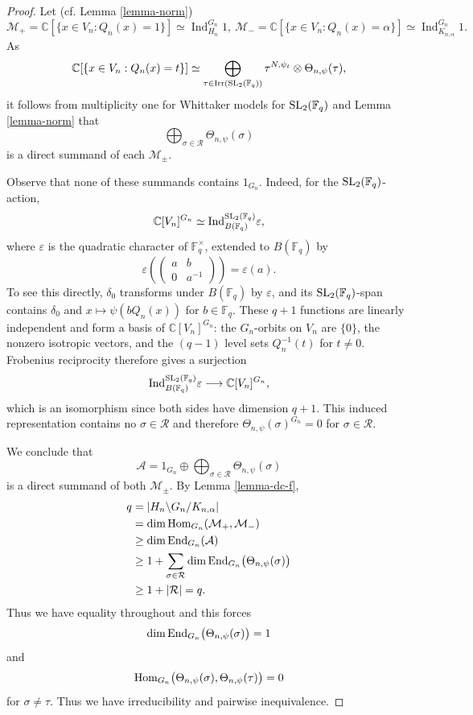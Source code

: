 \documentclass[12pt]{amsart}
\theoremstyle{definition}
\theoremstyle{remark}
\begin{document}
\begin{proof}
Let (cf. Lemma \ref{lemma-norm})
\[
\mathcal M_+
=\mathbb C[\{x\in V_n:Q_n(x)=1\}]
\simeq \operatorname{Ind}_{H_n}^{G_n}1,
~
\mathcal M_-
=\mathbb C[\{x\in V_n:Q_n(x)=\alpha\}]
\simeq \operatorname{Ind}_{K_{n,\alpha}}^{G_n}1.
\]
As 
\[
\mathbb C[\{x\in V_n:Q_n(x)=t\}]
\simeq
\bigoplus_{\tau \in {\rm Irr}({\rm SL}_2(\mathbb F_q))}
\tau^{N,\psi_t}\otimes\Theta_{n,\psi}(\tau),
\]
it follows from multiplicity one for Whittaker models for ${\rm SL}_2(\mathbb F_q)$ and Lemma \ref{lemma-norm} that
\[
\bigoplus_{\sigma\in\mathcal R}\Theta_{n,\psi}(\sigma)
\]
is a direct summand of each $\mathcal M_\pm$.

Observe that none of these summands contains $1_{G_n}$. Indeed, for the 
${\rm SL}_2(\mathbb F_q)$-action,
\[
\mathbb C[V_n]^{G_n}
\simeq
{\rm Ind}_{B(\mathbb F_q)}^{{\rm SL}_2(\mathbb F_q)}
\varepsilon,
\]
where $\varepsilon$ is the quadratic character of $\mathbb F_q^\times$,
extended to $B(\mathbb F_q)$ by
\[
\varepsilon\!\left(
\begin{pmatrix}a&b\\0&a^{-1}\end{pmatrix}
\right)=\varepsilon(a).
\]
To see this directly, $\delta_0$ transforms under $B(\mathbb F_q)$
by $\varepsilon$, and its ${\rm SL}_2(\mathbb F_q)$-span contains $\delta_0$ and 
$
x\longmapsto\psi(bQ_n(x))$ for $b\in\mathbb F_q$. 
These $q+1$ functions are linearly independent and form a basis of
$\mathbb C[V_n]^{G_n}$: the $G_n$-orbits on $V_n$ are $\{0\}$,
the nonzero isotropic vectors, and the $(q-1)$ level sets $Q_n^{-1}(t)$ for $t \neq 0$.
Frobenius reciprocity therefore gives a surjection
\[
{\rm Ind}_{B(\mathbb F_q)}^{{\rm SL}_2(\mathbb F_q)}
\varepsilon
\longrightarrow
\mathbb C[V_n]^{G_n},
\]
which is an isomorphism since both sides have dimension $q+1$.
This induced representation contains no $\sigma\in\mathcal R$ and therefore
$\Theta_{n,\psi}(\sigma)^{G_n}=0$ for $\sigma\in\mathcal R$.

We conclude that
\[
\mathcal A
=
1_{G_n}\oplus
\bigoplus_{\sigma\in\mathcal R}\Theta_{n,\psi}(\sigma)
\]
is a direct summand of both $\mathcal M_\pm$.
By Lemma \ref{lemma-dc-f}, 
\begin{align*}
q
&=|H_n\backslash G_n/K_{n,\alpha}|\\
&=\dim {\rm Hom}_{G_n}(\mathcal M_+,\mathcal M_-)\\
&\geq\dim {\rm End}_{G_n}(\mathcal A)\\
&\geq
1+\sum_{\sigma\in\mathcal R}
\dim {\rm End}_{G_n}\bigl(\Theta_{n,\psi}(\sigma)\bigr)\\
&\geq 1+|\mathcal R|=q.
\end{align*}
Thus we have equality throughout and this forces
\[
\dim {\rm End}_{G_n}\bigl(\Theta_{n,\psi}(\sigma)\bigr)=1
\]
and
\[
{\rm Hom}_{G_n}
\bigl(\Theta_{n,\psi}(\sigma),\Theta_{n,\psi}(\tau)\bigr)=0
\] for $\sigma\neq\tau$.
Thus we have irreducibility and pairwise inequivalence.


\end{proof}
\end{document}
